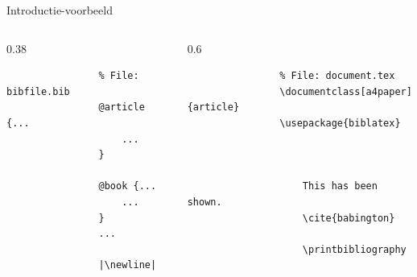 \begin{frame}[fragile]{Introductie-voorbeeld}
	\begin{columns}[T]
		\begin{column}{0.38\linewidth}
			\begin{verbatim}
				% File: bibfile.bib
				@article {...
					...
				}

				@book {...
					...
				}
				...

				|\newline|
			\end{verbatim}
		\end{column}%
		
		\begin{column}{0.6\linewidth}
			\begin{verbatim}
				% File: document.tex
				\documentclass[a4paper]{article}
				\usepackage{biblatex}
				
				
				
					This has been shown.
					\cite{babington}

					\printbibliography
				
			\end{verbatim}
		\end{column}
	\end{columns}
\end{frame}
